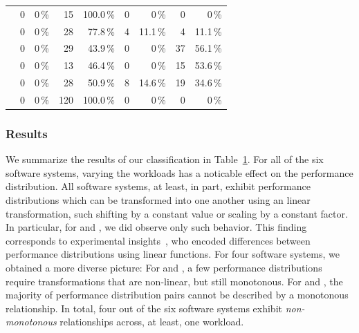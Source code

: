 {\begin{table}
\begin{tabular}{lrrrrrrrr}
	\jumper & 
	0 & 0\,\% & 
	\cellcolor{lt-color!100!white}15 & \cellcolor{lt-color!100!white}100.0\,\% & 
	0 & 0\,\% & 
	0 & 0\,\%\\
	
	\kanzi & 
	0 & 0\,\% & 
	\cellcolor{lt-color!78!white}28 & \cellcolor{lt-color!78!white}77.8\,\% & 
	\cellcolor{xmt-color!11!white}	4& \cellcolor{xmt-color!11!white}11.1\,\% & 
	\cellcolor{nmt-color!11!white}4 & \cellcolor{nmt-color!11!white}11.1\,\%\\
	
	\dconvert & 
	0 & 0\,\% & 
	\cellcolor{lt-color!43!white}29 & \cellcolor{lt-color!43!white}43.9\,\% & 
	0 & 0\,\% & 
	\cellcolor{nmt-color!56!white}37 & \cellcolor{nmt-color!56!white}56.1\,\%\\
	
	\htwo & 
	0& 0\,\% & 
	\cellcolor{lt-color!47!white}13 & \cellcolor{lt-color!47!white}46.4\,\% & 
	0 & 0\,\% & 
	\cellcolor{nmt-color!53!white}15 & \cellcolor{nmt-color!53!white}53.6\,\%\\
	
	\batik & 
	0 & 0\,\% & 
	\cellcolor{lt-color!50!white}28 & \cellcolor{lt-color!50!white}50.9\,\% & 
	\cellcolor{xmt-color!14!white}8 & \cellcolor{xmt-color!14!white}14.6\,\% & 
	\cellcolor{nmt-color!34!white}19 & \cellcolor{nmt-color!34!white}34.6\,\%\\
	
	\jadx & 
	0 & 0\,\% & 
	\cellcolor{lt-color!100!white}120 & \cellcolor{lt-color!100!white}100.0\,\% & 
	0 & 0\,\% & 
	0 & 0\,\%\\
	
	\bottomrule
	\end{tabular}
	\label{tab:categorization_counts}
\end{table}
\subsubsection{Results}
We summarize the results of our classification in Table~\ref{tab:categorization_counts}. For all of the six software systems, varying the workloads has a noticable effect on the performance distribution. All software systems, at least, in part, exhibit performance distributions which can be transformed into one another using an linear  transformation, such shifting by a constant value or scaling by a constant factor. In particular, for \jumper and \jadx, we did  observe only such behavior. This finding corresponds to experimental insights~\citeauthor{jamishidi_transfer_2017}, who encoded differences between performance distributions using linear functions. For four software systems, we obtained a more diverse picture: For \kanzi and \batik, a few performance distributions require transformations that are non-linear, but still monotonous. For \dconvert and \htwo, the majority of performance distribution pairs cannot be described by a monotonous relationship. In total, four out of the six software systems exhibit \emph{non-monotonous} relationships across, at least, one workload.

}
